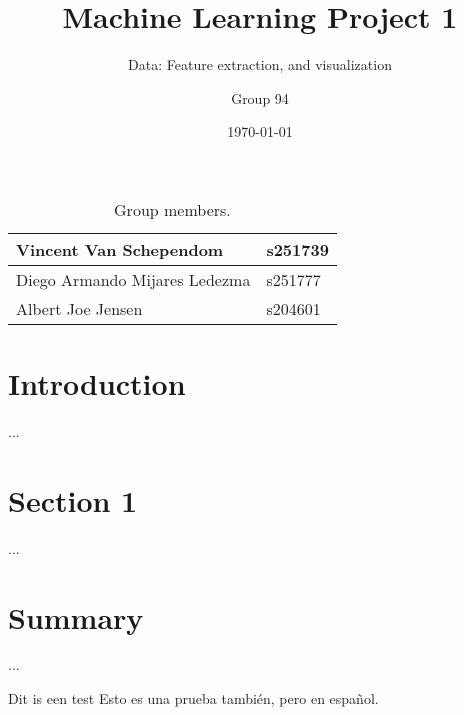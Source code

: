 \documentclass[dtu]{dtuarticle}
\title{Machine Learning Project 1}
\subtitle{Data: Feature extraction, and visualization}
\author{Group 94}
\date{\today}
\begin{document}
	\maketitle

	\begin{table}[h!]
		\centering
		\begin{tabular}{l | l}
			Vincent Van Schependom & s251739 \\ \hline
			Diego Armando Mijares Ledezma & s251777 \\ \hline
			Albert Joe Jensen & s204601
		\end{tabular}
		\caption{Group members.}
	\end{table}

	\section*{Introduction}

	...

	\section{Section 1}

	...

	\section*{Summary}

	...

	\newpage

	Dit is een test
 	Esto es una prueba también, pero en español. 
\end{document}
